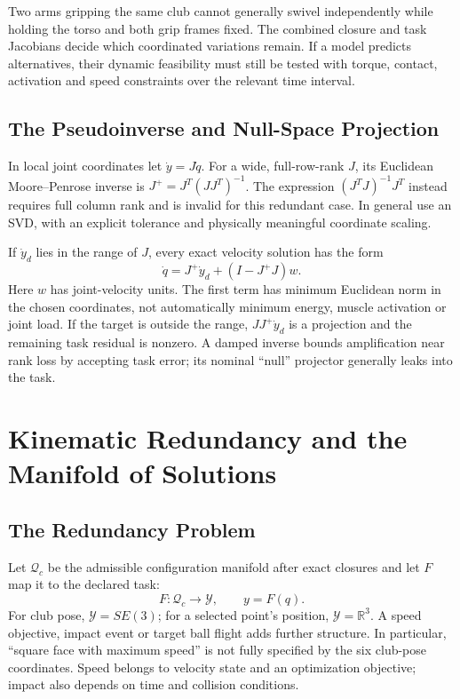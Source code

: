 Two arms gripping the same club cannot generally swivel independently while holding the torso and both grip frames fixed. The combined closure and task Jacobians decide which coordinated variations remain. If a model predicts alternatives, their dynamic feasibility must still be tested with torque, contact, activation and speed constraints over the relevant time interval.

\subsection{The Pseudoinverse and Null-Space Projection}

In local joint coordinates let $\dot y=J\dot q$. For a wide, full-row-rank $J$, its Euclidean Moore--Penrose inverse is $J^+=J^T(JJ^T)^{-1}$. The expression $(J^TJ)^{-1}J^T$ instead requires full column rank and is invalid for this redundant case. In general use an SVD, with an explicit tolerance and physically meaningful coordinate scaling.

If $\dot y_d$ lies in the range of $J$, every exact velocity solution has the form
\begin{equation}
\dot q=J^+\dot y_d+(I-J^+J)w.
\label{eq:ch23_pseudoinverse_solution}
\end{equation}
Here $w$ has joint-velocity units. The first term has minimum Euclidean norm in the chosen coordinates, not automatically minimum energy, muscle activation or joint load. If the target is outside the range, $JJ^+\dot y_d$ is a projection and the remaining task residual is nonzero. A damped inverse bounds amplification near rank loss by accepting task error; its nominal ``null'' projector generally leaks into the task.

\section{Kinematic Redundancy and the Manifold of Solutions}
\label{laymans:box:ch23_redundancy_intro}
\label{sec:manifold_solutions}

\subsection{The Redundancy Problem}

Let $\mathcal Q_c$ be the admissible configuration manifold after exact closures and let $F$ map it to the declared task:
\begin{equation}
F:\mathcal Q_c\longrightarrow\mathcal Y,\qquad y=F(q).
\label{eq:ch23_task_space}
\end{equation}
For club pose, $\mathcal Y=SE(3)$; for a selected point's position, $\mathcal Y=\mathbb R^3$. A speed objective, impact event or target ball flight adds further structure. In particular, ``square face with maximum speed'' is not fully specified by the six club-pose coordinates. Speed belongs to velocity state and an optimization objective; impact also depends on time and collision conditions.

